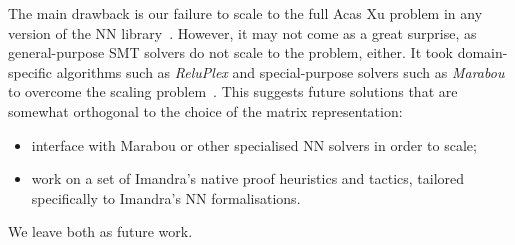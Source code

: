 \documentclass[runningheads]{llncs}
\begin{document}
The main drawback is our failure to scale to the full Acas Xu problem in any version of the NN library~\cite{DPKD22}. However, it may not come as a great surprise, as general-purpose SMT solvers do not scale to the problem, either.  It took  domain-specific algorithms such as \emph{ReluPlex} and special-purpose solvers such as \emph{Marabou}  to overcome the scaling problem~\cite{KaBaDiJuKo17Reluplex,KatzHIJLLSTWZDK19}.
This suggests future solutions that are somewhat orthogonal to the choice of the matrix representation:
\begin{itemize}
  \item interface with Marabou or other specialised NN solvers in order to scale;
\item work on a set of Imandra's native proof heuristics and tactics, tailored specifically to Imandra's NN formalisations.
\end{itemize}

We leave both as future work. 



%
%


\end{document}
